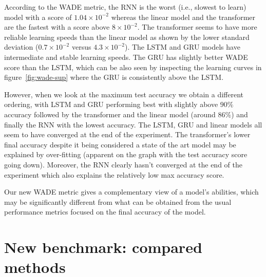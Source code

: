 {According to the WADE metric, the RNN is the worst (i.e., slowest to learn) model
with a score of $1.04 \times 10^{-2}$ whereas the linear model and the transformer
are the fastest with a score above $8 \times 10^{-2}$. The transformer seems to have
more reliable learning speeds than the linear model as shown by the lower
standard deviation ($0.7\times 10 ^{-2}$ versus $4.3 \times 10^{-2}$). The LSTM and GRU
models have intermediate and stable learning speeds.
The GRU has slightly better WADE score than the LSTM, which can be also seen by inspecting the learning curves in figure~\ref{fig:wade-sup} where the GRU is consistently above the LSTM.

However, when we look at the maximum test accuracy we obtain a different ordering,
with LSTM and GRU performing best with slightly above $90\%$ accuracy followed by the
transformer and the linear model (around $86\%$) and finally the RNN with the lowest
accuracy. The LSTM, GRU and linear models all seem to have converged at the end
of the experiment. The transformer's lower final accuracy despite it being
considered a state of the art model may be explained by over-fitting (apparent
on the graph with the test accuracy score going down). Moreover, the RNN clearly
hasn't converged at the end of the experiment which also explains the relatively
low max accuracy score.

Our new WADE metric gives a complementary view of a model's abilities, which may be significantly different from what can be obtained from the usual
performance metrics focused on the final accuracy of the model.


\section{New benchmark: compared methods\label{sec:compared-methods}}

}
